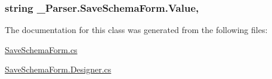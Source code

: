 \subsubsection[{\texorpdfstring{Value}{Value}}]{\setlength{\rightskip}{0pt plus 5cm}string \+\_\+Parser.\+Save\+Schema\+Form.\+Value\hspace{0.3cm}{\ttfamily [get]}, {\ttfamily [set]}}\hypertarget{class__1920_parser_1_1_save_schema_form_a68c8f0527dcaa8c7075eab2e0a8af8e1}{}\label{class__1920_parser_1_1_save_schema_form_a68c8f0527dcaa8c7075eab2e0a8af8e1}


The documentation for this class was generated from the following files\+:\begin{DoxyCompactItemize}
\item 
\hyperlink{_save_schema_form_8cs}{Save\+Schema\+Form.\+cs}\item 
\hyperlink{_save_schema_form_8_designer_8cs}{Save\+Schema\+Form.\+Designer.\+cs}\end{DoxyCompactItemize}
